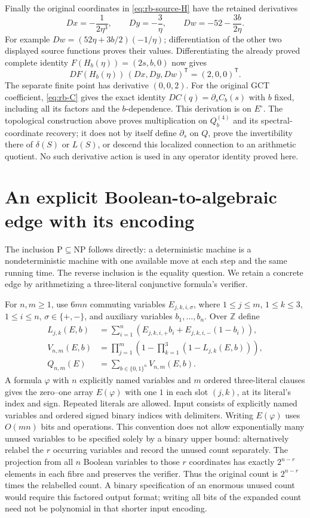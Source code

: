 Finally the original coordinates in \eqref{eq:rb-source-H} have
the retained derivatives
\[
 Dx=-\frac1{2\eta^3},\qquad
 Dy=-\frac3\eta,\qquad
 Dw=-52-\frac{3b}{2\eta}.
\]
For example $Dw=(52\eta+3b/2)(-1/\eta)$; differentiation of the
other two displayed source functions proves their values.
Differentiating the already proved complete identity
$F(H_b(\eta))=(2s,b,0)$ now gives
\[
 DF(H_b(\eta))\,(Dx,Dy,Dw)^{\mathsf T}=(2,0,0)^{\mathsf T}.
\]
The separate finite point has derivative $(0,0,2)$.
For the original GCT coefficient, \eqref{eq:rb-C} gives the exact
identity $DC(q)=\partial_s C_b(s)$ with $b$ fixed, including all
its factors and the $b$-dependence. This derivation is on
$E^\circ$. The topological construction above proves multiplication
on $Q_b^{(4)}$ and its spectral-coordinate recovery; it does not
by itself define $\partial_s$ on $Q$, prove the invertibility there
of $\delta(S)$ or $L(S)$, or descend this localized connection to
an arithmetic quotient. No such derivative action is used in any
operator identity proved here.


\section{An explicit Boolean-to-algebraic edge with its encoding}
\label{sec:boolean}
The inclusion $\mathrm P\subseteq\mathrm{NP}$ follows directly:
a deterministic machine is a nondeterministic machine with one
available move at each step and the same running time.
The reverse inclusion is the equality question.
We retain a concrete edge by arithmetizing a three-literal conjunctive
formula's verifier.

For $n,m\ge1$, use $6mn$ commuting variables $E_{j,k,i,\sigma}$,
where $1\le j\le m$, $1\le k\le3$, $1\le i\le n$,
$\sigma\in\{+,-\}$, and auxiliary variables $b_1,\ldots,b_n$.
Over $\mathbb Z$ define
\begin{align*}
 L_{j,k}(E,b)&=\sum_{i=1}^n
   (E_{j,k,i,+}b_i+E_{j,k,i,-}(1-b_i)),\\
 V_{n,m}(E,b)&=\prod_{j=1}^m
   \left(1-\prod_{k=1}^3(1-L_{j,k}(E,b))\right),\\
 Q_{n,m}(E)&=\sum_{b\in\{0,1\}^n}V_{n,m}(E,b).
\end{align*}
A formula $\varphi$ with $n$ explicitly named variables and $m$
ordered three-literal clauses gives the zero--one array $E(\varphi)$
with one $1$ in each slot $(j,k)$, at its literal's index and sign.
Repeated literals are allowed. Input consists of explicitly named
variables and ordered signed binary indices with delimiters.
Writing $E(\varphi)$ uses $O(mn)$ bits and operations.
This convention does not allow exponentially many unused variables
to be specified solely by a binary upper bound: alternatively relabel
the $r$ occurring variables and record the unused count separately.
The projection from all $n$ Boolean variables to those $r$ coordinates
has exactly $2^{n-r}$ elements in each fibre and preserves the verifier.
Thus the original count is $2^{n-r}$ times the relabelled count.
A binary specification of an enormous unused count would require this
factored output format; writing all bits of the expanded count need
not be polynomial in that shorter input encoding.

